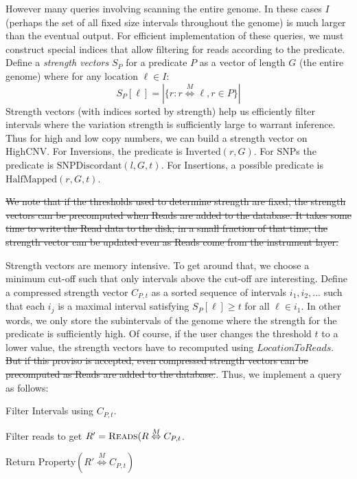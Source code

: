 \documentclass[10pt,fullpage]{article}
\def\ensuretext{\textrm}
\newcommand{\Reads}{\ensuretext{{\sc Reads}}}
\newcommand{\MapRel}{\ensuremath{\stackrel{M}{\Leftrightarrow}}}
\newenvironment{packed_enum}{
\begin{enumerate}
  \setlength{\itemsep}{1pt}
  \setlength{\parskip}{0pt}
  \setlength{\parsep}{0pt}
}{\end{enumerate}}
\begin{document}
However many queries involving scanning the entire genome. In these
cases $I$ (perhaps the set of all fixed size intervals throughout the
genome) is much larger than the eventual output. For efficient
implementation of these queries, we must construct special indices
that allow filtering for reads according to the predicate. Define a
{\em strength vectors} $S_P$ for a predicate $P$ as a vector of length
$G$ (the entire genome) where for any location $\ell \in I$:
\[S_P[\ell] = |\{r: r \MapRel \ell, r \in P\}|
\]
Strength vectors (with indices sorted by strength) help us efficiently
filter intervals where the variation strength is sufficiently large to
warrant inference. Thus for high and low copy numbers, we can build a
strength vector on {\sc HighCNV}. For Inversions, the predicate is
$\mbox{Inverted}(r,G)$.  For SNPs the predicate is
$\mbox{SNPDiscordant}(l,G,t)$.  For Insertions, a possible predicate
is $\mbox{HalfMapped}(r,G,t)$.

\sout{We note that if the thresholds used to determine strength are
  fixed, the strength vectors can be precomputed when Reads are added
  to the database.  It takes some time to write the Read data to the
  disk; in a small fraction of that time, the strength vector can be
  updated even as Reads come from the instrument layer. }

Strength vectors are memory intensive. To get around that, we choose a
minimum cut-off such that only intervals above the cut-off are
interesting. Define a compressed strength vector $C_{P,t}$ as a sorted
sequence of intervals $i_1, i_2, \ldots$ such that each $i_j$ is a
maximal interval satisfying $S_P[\ell] \geq t$ for all $\ell\in i_1$.
In other words, we only store the subintervals of the genome where the
strength for the predicate is sufficiently high.  Of course, if the
user changes the threshold $t$ to a lower value, the strength vectors
have to recomputed using $LocationToReads$.  \sout{But if this proviso is
accepted, even compressed strength vectors can be precomputed as Reads
are added to the database.}. Thus, we implement a query as follows:
\begin{packed_enum}
  \item Filter Intervals using $C_{P,t}$.
  \item Filter reads to get $R'=\Reads(R\MapRel C_{P,t}$.
  \item Return {\sc Property}$(R'\MapRel C_{P,t})$
\end{packed_enum}
\end{document}
